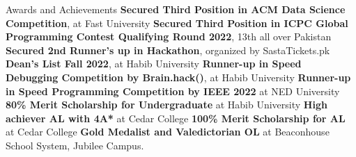 \begin{rubric}{Awards and Achievements}
    \entry*[2023]\textbf{Secured Third Position in ACM Data Science Competition}, at Fast University
    \entry*[2022]\textbf{Secured Third Position in ICPC Global Programming Contest Qualifying Round 2022}, 13th all over Pakistan
    \entry*\textbf{Secured 2nd Runner's up in Hackathon}, organized by SastaTickets.pk
    \entry*\textbf{Dean's List Fall 2022}, at Habib University
    \entry*\textbf{Runner-up in Speed Debugging Competition by Brain.hack()}, at Habib University
    \entry*\textbf{Runner-up in Speed Programming Competition by IEEE 2022} at NED University
    \entry*[2020]\textbf{80\% Merit Scholarship for Undergraduate} at Habib University
    \entry*\textbf{High achiever AL with 4A*} at Cedar College
    \entry*[2018]\textbf{100\% Merit Scholarship for AL} at Cedar College
    \entry*\textbf{Gold Medalist and Valedictorian OL} at Beaconhouse School System, Jubilee Campus.

    \end{rubric}
    